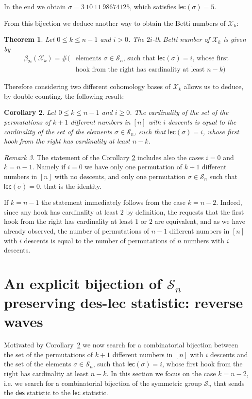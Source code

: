 \documentclass[a4paper]{amsart}
\newcommand{\des}{\mathsf{des}}
\newcommand{\lec}{\mathsf{lec}}
\newcommand{\cX}{\mathcal X}
\newtheorem{theorem}{Theorem}[section]
\newtheorem{corollary}[theorem]{Corollary}
\theoremstyle{definition}
\theoremstyle{remark}
\newtheorem{remark}[theorem]{Remark}
\numberwithin{equation}{section}
\begin{document}
In the end we obtain $\sigma = 3 \  10 \  11 \  9 8674125$, which satisfies  $\lec(\sigma)=5$.

From this bijection we deduce another way to obtain the Betti numbers of $\cX_{k}$:
\begin{theorem}
Let $0\leq k\leq n-1$ and $i>0$. The $2i$-th Betti number of $\cX_{k}$ is given by
\begin{align*}
\beta_{2i}(\cX_{k})= \# (&\text{elements \(\sigma\in \mathcal{S}_n\), such that  \(\lec(\sigma)=i\), whose  first}\\
&\text{hook from the right has cardinality at least \(n-k\)})
\end{align*}
\end{theorem}

Therefore considering two different cohomology bases of  $\cX_{k}$ allows us to deduce, by  double counting, the following result:
\begin{corollary}
\label{corollario:bigezionek}
Let $0\leq k\leq n-1$ and $i\geq0$. The cardinality of the set of the permutations of $k+1$ different numbers in $[n]$ with $i$ descents is equal to the cardinality of  the set of the  elements \(\sigma\in \mathcal{S}_n\), such that  \(\lec(\sigma)=i\),  whose  first hook from the right %
 has cardinality at least \(n-k\).
\end{corollary}

\begin{remark}
    The statement of the Corollary \ref{corollario:bigezionek} includes also the cases $i=0$ and $k=n-1$. Namely if $i=0$ we have only one permutation of $k+1$ different numbers in $[n]$ with no descents, and only one permutation $\sigma\in\mathcal{S}_n$ such that $\lec(\sigma)=0$, that is the identity. 
    
    If $k=n-1$ the statement immediately follows from the case $k=n-2$. Indeed, since any hook has cardinality at least $2$ by definition, the requests that the first hook from the right has cardinality at least $1$ or $2$ are equivalent, and as we have already observed, the number of permutations of \(n-1\) different numbers in $[n]$ with \(i\) descents is equal to the number of permutations of \(n\) numbers with \(i\) descents.
\end{remark}


\section{An explicit  bijection of \texorpdfstring{$\mathcal{S}_n$}{Sn} preserving des-lec statistic: reverse waves}
\label{sec:reversewaves}
Motivated by Corollary~\ref{corollario:bigezionek} we now search for a combinatorial bijection between the set of the permutations of $k+1$ different numbers in $[n]$ with $i$ descents and the set of the  elements \(\sigma\in \mathcal{S}_n\), such that  \(\lec(\sigma)=i\),  whose  first hook from the right has cardinality at least \(n-k\).
In this section we  focus on the case \(k=n-2\), i.e. we search for a combinatorial bijection of the symmetric group $\mathcal{S}_n$ that sends the $\des$ statistic to the $\lec$ statistic. 
\end{document}
